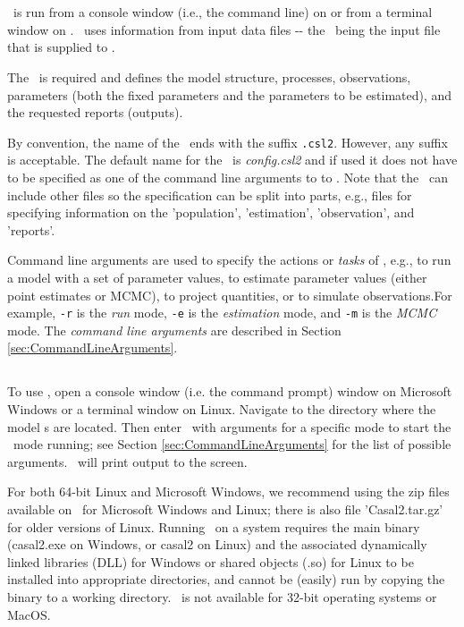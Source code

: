 \section{\label{sec:RunningCasal2}}

\CNAME\ is run from a console window (i.e., the command line) on  or from a terminal window on . \CNAME\ uses information from input data files -{}- the \emph{\config{}}\ being the input file that is supplied to \CNAME.

The \config\ is required and defines the model structure, processes, observations, parameters (both the fixed parameters and the parameters to be estimated), and the requested reports (outputs).

By convention, the name of the \config\ ends with the suffix \texttt{.csl2}. However, any suffix is acceptable. The default name for the \config\ is \emph{config.csl2} and if used it does not have to be specified as one of the command line arguments to to \CNAME. Note that the \config\ can include other files so the specification can be split into parts, e.g., files for specifying information on the 'population', 'estimation', 'observation', and 'reports'.

Command line arguments are used to specify the actions or \emph{tasks} of \CNAME, e.g., to run a model with a set of parameter values, to estimate parameter values (either point estimates or MCMC), to project quantities, or to simulate observations.For example, \texttt{-r} is the \emph{run} mode, \texttt{-e} is the \emph{estimation} mode, and \texttt{-m} is the \emph{MCMC} mode. The \emph{command line arguments} are described in Section \ref{sec:CommandLineArguments}.

\subsection{}

To use \CNAME, open a console window (i.e. the command prompt) window on Microsoft Windows or a terminal window on Linux. Navigate to the directory where the model \config s are located. Then enter \CNAME\ with arguments for a specific mode to start the \CNAME\ mode running; see Section \ref{sec:CommandLineArguments} for the list of possible arguments. \CNAME\ will print output to the screen.

For both 64-bit Linux and Microsoft Windows, we recommend using the zip files available on \github\ for Microsoft Windows and Linux; there is also file 'Casal2.tar.gz' for older versions of Linux. Running \CNAME\ on a system requires the main binary (casal2.exe on Windows, or casal2 on Linux) and the associated dynamically linked libraries (DLL) for Windows or shared objects (.so) for Linux to be installed into appropriate directories, and cannot be (easily) run by copying the binary to a working directory. \CNAME\ is not available for 32-bit operating systems or MacOS.

